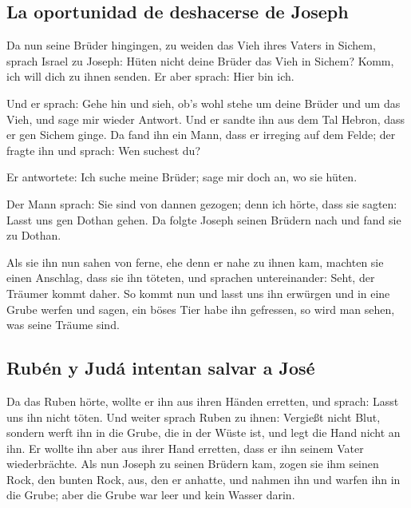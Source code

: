 \hypertarget{la-oportunidad-de-deshacerse-de-joseph}{%
\subsection{La oportunidad de deshacerse de
Joseph}\label{la-oportunidad-de-deshacerse-de-joseph}}

 Da nun seine Brüder hingingen, zu weiden das Vieh ihres
Vaters in Sichem,  sprach Israel zu Joseph: Hüten nicht
deine Brüder das Vieh in Sichem? Komm, ich will dich zu ihnen senden. Er
aber sprach: Hier bin ich.

 Und er sprach: Gehe hin und sieh, ob's wohl stehe um
deine Brüder und um das Vieh, und sage mir wieder Antwort. Und er sandte
ihn aus dem Tal Hebron, dass er gen Sichem ginge.  Da
fand ihn ein Mann, dass er irreging auf dem Felde; der fragte ihn und
sprach: Wen suchest du?

 Er antwortete: Ich suche meine Brüder; sage mir doch an,
wo sie hüten.

 Der Mann sprach: Sie sind von dannen gezogen; denn ich
hörte, dass sie sagten: Lasst uns gen Dothan gehen. Da folgte Joseph
seinen Brüdern nach und fand sie zu Dothan.

 Als sie ihn nun sahen von ferne, ehe denn er nahe zu
ihnen kam, machten sie einen Anschlag, dass sie ihn töteten,
 und sprachen untereinander: Seht, der Träumer kommt
daher.  So kommt nun und lasst uns ihn erwürgen und in
eine Grube werfen und sagen, ein böses Tier habe ihn gefressen, so wird
man sehen, was seine Träume sind.

\hypertarget{rubuxe9n-y-juduxe1-intentan-salvar-a-josuxe9}{%
\subsection{Rubén y Judá intentan salvar a
José}\label{rubuxe9n-y-juduxe1-intentan-salvar-a-josuxe9}}

 Da das Ruben hörte, wollte er ihn aus ihren Händen
erretten, und sprach: Lasst uns ihn nicht töten.  Und
weiter sprach Ruben zu ihnen: Vergießt nicht Blut, sondern werft ihn in
die Grube, die in der Wüste ist, und legt die Hand nicht an ihn. Er
wollte ihn aber aus ihrer Hand erretten, dass er ihn seinem Vater
wiederbrächte.  Als nun Joseph zu seinen Brüdern kam,
zogen sie ihm seinen Rock, den bunten Rock, aus, den er anhatte,
 und nahmen ihn und warfen ihn in die Grube; aber die
Grube war leer und kein Wasser darin.

